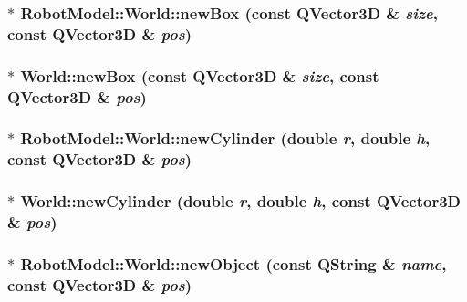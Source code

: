 \label{class_robot_model_1_1_world_a2ccf0c4dd817ecae42edbb82f54289a2}
\hypertarget{class_robot_model_1_1_world_a72a1de50cc6e30168aa642458cdb9c9e}{
\subsubsection[{newBox}]{$\ast$ RobotModel::World::newBox (const QVector3D \& {\em size}, \/  const QVector3D \& {\em pos})}}
\label{class_robot_model_1_1_world_a72a1de50cc6e30168aa642458cdb9c9e}
\hypertarget{class_robot_model_1_1_world_a9c100912af0adb5275b73b6660efe475}{
\subsubsection[{newBox}]{ $\ast$ World::newBox (const QVector3D \& {\em size}, \/  const QVector3D \& {\em pos})}}
\label{class_robot_model_1_1_world_a9c100912af0adb5275b73b6660efe475}
\hypertarget{class_robot_model_1_1_world_aed6d757ee7af4ba8a768f591da8b1397}{
\subsubsection[{newCylinder}]{$\ast$ RobotModel::World::newCylinder (double {\em r}, \/  double {\em h}, \/  const QVector3D \& {\em pos})}}
\label{class_robot_model_1_1_world_aed6d757ee7af4ba8a768f591da8b1397}
\hypertarget{class_robot_model_1_1_world_a8dd79f7cf657eda9de58181bc9fbb564}{
\subsubsection[{newCylinder}]{ $\ast$ World::newCylinder (double {\em r}, \/  double {\em h}, \/  const QVector3D \& {\em pos})}}
\label{class_robot_model_1_1_world_a8dd79f7cf657eda9de58181bc9fbb564}
\hypertarget{class_robot_model_1_1_world_ab806377e96318c2e3e24a273ffc99cb2}{
\subsubsection[{newObject}]{$\ast$ RobotModel::World::newObject (const QString \& {\em name}, \/  const QVector3D \& {\em pos})}}
